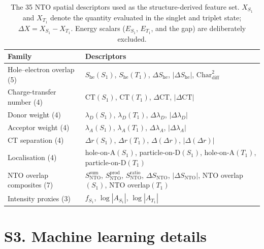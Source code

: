 \documentclass[twoside,twocolumn,9pt]{extarticle}
\begin{document}
\begin{table}[htbp]
  \centering
  \caption{The \num{35} NTO spatial descriptors used as the structure-derived
    feature set. $X_{S_1}$ and $X_{T_1}$ denote the quantity evaluated in the
    singlet and triplet state; $\Delta X = X_{S_1}-X_{T_1}$. Energy scalars
    ($E_{S_1}$, $E_{T_1}$, and the gap) are deliberately excluded.}
  \label{tab:descriptors}
  \footnotesize
  \begin{tabular}{p{}p{}}
    \toprule
    Family & Descriptors \\
    \midrule
    Hole--electron overlap (5)
      & $S_\text{he}(S_1)$, $S_\text{he}(T_1)$, $\Delta S_\text{he}$,
        $|\Delta S_\text{he}|$, $\text{Char}_\text{diff}^2$ \\
    \addlinespace
    Charge-transfer number (4)
      & $\text{CT}(S_1)$, $\text{CT}(T_1)$, $\Delta\text{CT}$, $|\Delta\text{CT}|$ \\
    \addlinespace
    Donor weight (4)
      & $\lambda_D(S_1)$, $\lambda_D(T_1)$, $\Delta\lambda_D$, $|\Delta\lambda_D|$ \\
    \addlinespace
    Acceptor weight (4)
      & $\lambda_A(S_1)$, $\lambda_A(T_1)$, $\Delta\lambda_A$, $|\Delta\lambda_A|$ \\
    \addlinespace
    CT separation (4)
      & $\Delta r(S_1)$, $\Delta r(T_1)$, $\Delta(\Delta r)$, $|\Delta(\Delta r)|$ \\
    \addlinespace
    Localisation (4)
      & hole-on-A$(S_1)$, particle-on-D$(S_1)$,
        hole-on-A$(T_1)$, particle-on-D$(T_1)$ \\
    \addlinespace
    NTO overlap composites (7)
      & $S_\text{NTO}^{\text{sum}}$, $S_\text{NTO}^{\text{prod}}$,
        $S_\text{NTO}^{\text{ratio}}$, $\Delta S_\text{NTO}$,
        $|\Delta S_\text{NTO}|$, NTO overlap$(S_1)$, NTO overlap$(T_1)$ \\
    \addlinespace
    Intensity proxies (3)
      & $f_{S_1}$, $\log|A_{S_1}|$, $\log|A_{T_1}|$ \\
    \bottomrule
  \end{tabular}
\end{table}

\section*{S3. Machine learning details}
\end{document}
